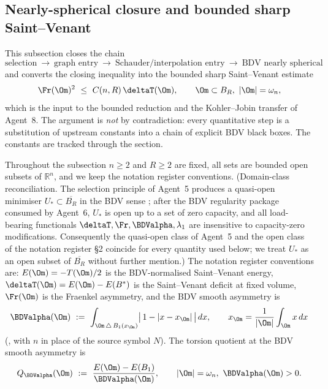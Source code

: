 \subsection{Nearly-spherical closure and bounded sharp Saint--Venant}
\label{sec:plan1-nearly-spherical}

This subsection closes the chain
\[
\text{selection}\ \longrightarrow\ \text{graph entry}\ \longrightarrow\
\text{Schauder/interpolation entry}\ \longrightarrow\
\text{BDV nearly spherical}
\]
and converts the closing inequality into the bounded sharp
Saint--Venant estimate
\begin{equation}\label{eq:plan1-target}
   \Fr(\Om)^{2}\ \le\ C(n,R)\,\deltaT(\Om),
   \qquad \Om\subset B_{R},\ |\Om|=\omega_{n},
\end{equation}
which is the input to the bounded reduction and the Kohler--Jobin
transfer of Agent~8. The argument is \emph{not} by contradiction: every
quantitative step is a substitution of upstream constants into a chain
of explicit BDV black boxes. The constants are tracked through the
section.

Throughout the subsection $n\ge 2$ and $R\ge 2$ are fixed, all sets are
bounded open subsets of $\mathbb{R}^{n}$, and we keep the notation
register conventions. (Domain-class reconciliation. The selection
principle of Agent~5 produces a quasi-open minimiser
$U_*\subset\overline{B_R}$ in the BDV sense
\cite[\S2]{BDV}; after the BDV regularity package
\cite[Lem.~4.9,~4.12,~4.16,~Thm.~4.18]{BDV} consumed by Agent~6,
$U_*$ is open up to a set of zero capacity, and all load-bearing
functionals $\deltaT,\Fr,\BDValpha,\lambda_1$ are insensitive to
capacity-zero modifications. Consequently the quasi-open class of
Agent~5 and the open class of the notation register \S2 coincide for
every quantity used below; we treat $U_*$ as an open subset of
$\overline{B_R}$ without further mention.)
The notation register conventions are: $E(\Om)=-T(\Om)/2$ is the BDV-normalised
Saint--Venant energy, $\deltaT(\Om)=E(\Om)-E(B^{*})$ is the Saint--Venant
deficit at fixed volume, $\Fr(\Om)$ is the Fraenkel asymmetry, and the
BDV smooth asymmetry is
\[
\BDValpha(\Om)\ :=\ \int_{\Om\,\triangle\, B_{1}(x_{\Om})}
   \bigl|\,1-|x-x_{\Om}|\,\bigr|\,dx,
   \qquad
   x_{\Om}=\frac{1}{|\Om|}\int_{\Om} x\,dx
\]
(\cite[Definition~4.1]{BDV}, with $n$ in place of the source
symbol $N$). The torsion quotient at the BDV smooth asymmetry is
\[
Q_{\BDValpha}(\Om)\ :=\ \frac{E(\Om)-E(B_{1})}{\BDValpha(\Om)},
   \qquad |\Om|=\omega_{n},\ \BDValpha(\Om)>0.
\]

